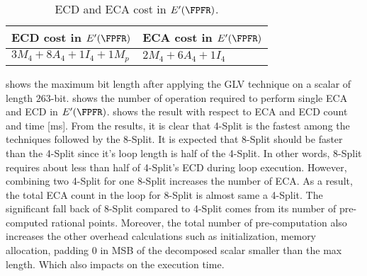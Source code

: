 \begin{table}[t]
\centering
\caption{Maximum length of scalar $s$ after GLV decomposition in different dimensions.}
\label{s_length}
\end{table}
\begin{table}[t]
	\centering
	\caption{ECD and ECA cost in $E'(\FPFR)$.}
	\label{ecaecd_fp4}
	\begin{tabular}{|l|l|}
		\hline
		ECD cost in $E'(\FPFR)$           & ECA cost in $E'(\FPFR)$  \\ \hline
		$3 M_4 + 8 A_4 + 1 I_4 + 1 M_p$ & $2 M_4 + 6 A_4 + 1 I_4$ \\ \hline
	\end{tabular}
\end{table}
\renewcommand{\baselinestretch}{1.0}
 shows the maximum bit length after applying the GLV technique on a scalar of length $263$-bit.
 shows the number of operation required to perform single ECA and ECD in $E'(\FPFR)$.
 shows the result with respect to ECA and ECD count and time [ms].
From the results, it is clear that 4-Split is the fastest among the techniques followed by the 8-Split.
It is expected that 8-Split should be faster than the 4-Split since it's loop length is half of the 4-Split.
In other words, 8-Split requires about less than half of 4-Split's ECD during loop execution. 
However, combining two 4-Split for one 8-Split increases the number of ECA.
As a result, the total ECA count in the loop for  8-Split is almost same a 4-Split.
The significant fall back of 8-Split compared to 4-Split comes from its number of pre-computed rational points.
Moreover, the total number of pre-computation also increases the other overhead calculations such as initialization, memory allocation, padding $0$ in MSB of the decomposed scalar smaller than the max length. Which also impacts on the execution time. 
